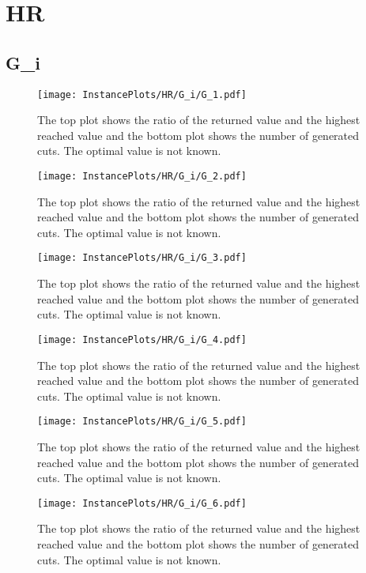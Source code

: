 \documentclass[10pt,a4paper]{article}
\begin{document}
\section{HR}
\subsection{G\_i}
\begin{figure}[H]
\texttt{[image: InstancePlots/HR/G\_i/G\_1.pdf]}
\caption{The top plot shows the ratio of the returned value and the highest reached value     and the bottom plot shows the number of generated cuts. The optimal value is not known.}
\end{figure}

\begin{figure}[H]
\texttt{[image: InstancePlots/HR/G\_i/G\_2.pdf]}
\caption{The top plot shows the ratio of the returned value and the highest reached value     and the bottom plot shows the number of generated cuts. The optimal value is not known.}
\end{figure}

\begin{figure}[H]
\texttt{[image: InstancePlots/HR/G\_i/G\_3.pdf]}
\caption{The top plot shows the ratio of the returned value and the highest reached value     and the bottom plot shows the number of generated cuts. The optimal value is not known.}
\end{figure}

\begin{figure}[H]
\texttt{[image: InstancePlots/HR/G\_i/G\_4.pdf]}
\caption{The top plot shows the ratio of the returned value and the highest reached value     and the bottom plot shows the number of generated cuts. The optimal value is not known.}
\end{figure}

\begin{figure}[H]
\texttt{[image: InstancePlots/HR/G\_i/G\_5.pdf]}
\caption{The top plot shows the ratio of the returned value and the highest reached value     and the bottom plot shows the number of generated cuts. The optimal value is not known.}
\end{figure}

\begin{figure}[H]
\texttt{[image: InstancePlots/HR/G\_i/G\_6.pdf]}
\caption{The top plot shows the ratio of the returned value and the highest reached value     and the bottom plot shows the number of generated cuts. The optimal value is not known.}
\end{figure}
\end{document}
